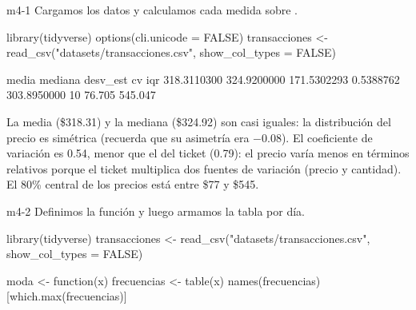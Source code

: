 
\begin{solucion}{m4-1}
Cargamos los datos y calculamos cada medida sobre .
\end{solucion}

\begin{rcode}
library(tidyverse)
options(cli.unicode = FALSE)
transacciones <- read_csv("datasets/transacciones.csv",
                          show_col_types = FALSE)
\end{rcode}

\begin{rsalida}
      media     mediana    desv_est          cv         iqr
318.3110300 324.9200000 171.5302293   0.5388762 303.8950000
    10%
 76.705 545.047
\end{rsalida}

La media (\$318.31) y la mediana (\$324.92) son casi iguales: la
distribución del precio es simétrica (recuerda que su asimetría era
$-0.08$). El coeficiente de variación es 0.54, menor que el del ticket
(0.79): el precio varía menos en términos relativos porque el ticket
multiplica dos fuentes de variación (precio y cantidad). El 80\% central de
los precios está entre \$77 y \$545.


\begin{solucion}{m4-2}
Definimos la función  y luego armamos la tabla por día.
\end{solucion}

\begin{rcode}
library(tidyverse)
transacciones <- read_csv("datasets/transacciones.csv",
                          show_col_types = FALSE)

moda <- function(x) {
  frecuencias <- table(x)
  names(frecuencias)[which.max(frecuencias)]
}
\end{rcode}

